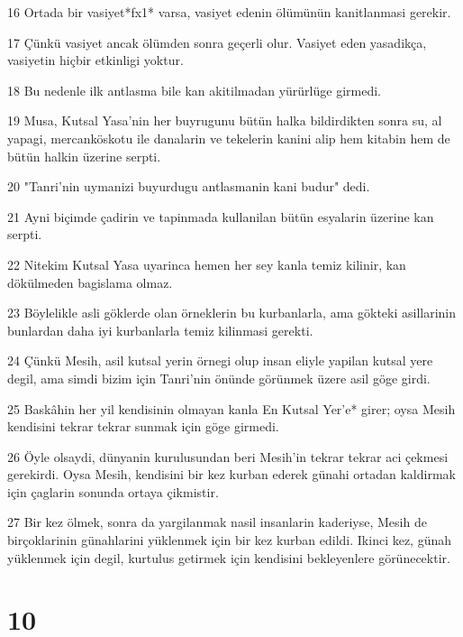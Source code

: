 \par 16 Ortada bir vasiyet*fx1* varsa, vasiyet edenin ölümünün kanitlanmasi gerekir.
\par 17 Çünkü vasiyet ancak ölümden sonra geçerli olur. Vasiyet eden yasadikça, vasiyetin hiçbir etkinligi yoktur.
\par 18 Bu nedenle ilk antlasma bile kan akitilmadan yürürlüge girmedi.
\par 19 Musa, Kutsal Yasa'nin her buyrugunu bütün halka bildirdikten sonra su, al yapagi, mercanköskotu ile danalarin ve tekelerin kanini alip hem kitabin hem de bütün halkin üzerine serpti.
\par 20 "Tanri'nin uymanizi buyurdugu antlasmanin kani budur" dedi.
\par 21 Ayni biçimde çadirin ve tapinmada kullanilan bütün esyalarin üzerine kan serpti.
\par 22 Nitekim Kutsal Yasa uyarinca hemen her sey kanla temiz kilinir, kan dökülmeden bagislama olmaz.
\par 23 Böylelikle asli göklerde olan örneklerin bu kurbanlarla, ama gökteki asillarinin bunlardan daha iyi kurbanlarla temiz kilinmasi gerekti.
\par 24 Çünkü Mesih, asil kutsal yerin örnegi olup insan eliyle yapilan kutsal yere degil, ama simdi bizim için Tanri'nin önünde görünmek üzere asil göge girdi.
\par 25 Baskâhin her yil kendisinin olmayan kanla En Kutsal Yer'e* girer; oysa Mesih kendisini tekrar tekrar sunmak için göge girmedi.
\par 26 Öyle olsaydi, dünyanin kurulusundan beri Mesih'in tekrar tekrar aci çekmesi gerekirdi. Oysa Mesih, kendisini bir kez kurban ederek günahi ortadan kaldirmak için çaglarin sonunda ortaya çikmistir.
\par 27 Bir kez ölmek, sonra da yargilanmak nasil insanlarin kaderiyse, Mesih de birçoklarinin günahlarini yüklenmek için bir kez kurban edildi. Ikinci kez, günah yüklenmek için degil, kurtulus getirmek için kendisini bekleyenlere görünecektir.

\chapter{10}

